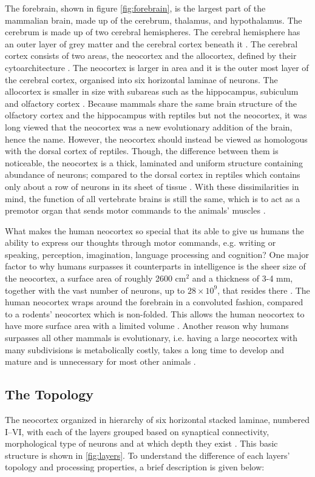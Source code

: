 The forebrain, shown in figure \autoref{fig:forebrain}, is the largest part of the mammalian brain, made up of the cerebrum, thalamus, and hypothalamus. The cerebrum is made up of two cerebral hemispheres. The cerebral hemisphere has an outer layer of grey matter and the cerebral cortex beneath it \cite{crossman2014neuroanatomy}. The cerebral cortex consists of two areas, the neocortex and the allocortex, defined by their cytoarchitecture \cite{Allocortex}. The neocortex is larger in area and it is the outer most layer of the cerebral cortex, organised into six horizontal laminae of neurons. The allocortex is smaller in size with subareas such as the hippocampus, subiculum and olfactory cortex \cite{Neocortex}. Because mammals share the same brain structure of the olfactory cortex and the hippocampus with reptiles but not the neocortex, it was long viewed that the neocortex was a new evolutionary addition of the brain, hence the name. However, the neocortex should instead be viewed as homologous with the dorsal cortex of reptiles. Though, the difference between them is noticeable, the neocortex is a thick, laminated and uniform structure containing abundance of neurons; compared to the dorsal cortex in reptiles which contains only about a row of neurons in its sheet of tissue \cite{Neocortex}. With these dissimilarities in mind, the function of all vertebrate brains is still the same, which is to act as a premotor organ that sends motor commands to the animals' muscles \cite{10.3389/fnana.2013.00051}. 


What makes the human neocortex so special that its able to give us humans the ability to express our thoughts through motor commands, e.g. writing or speaking, perception, imagination, language processing and cognition? One major factor to why humans surpasses it counterparts in intelligence is the sheer size of the neocortex, a surface area of roughly 2600 cm$^2$ and a thickness of 3-4 mm, together with the vast number of neurons, up to $28\times10^9$, that resides there \cite{MountcastleVernon1997}. The human neocortex wraps around the forebrain in a convoluted fashion, compared to a rodents' neocortex which is non-folded. This allows the human neocortex to have more surface area with a limited volume \cite{folded}. Another reason why humans surpasses all other mammals is evolutionary, i.e. having a large neocortex with many subdivisions is metabolically costly, takes a long time to develop and mature and is unnecessary for most other animals \cite{Neocortex}. 


\subsection{The Topology}
The neocortex organized in hierarchy of six horizontal stacked laminae, numbered I--VI, with each of the layers grouped based on synaptical connectivity, morphological type of neurons and at which depth they exist \cite{Neocortex}. This basic structure is shown in \autoref{fig:layers}. To understand the difference of each layers' topology and processing properties, a brief description is given below:



